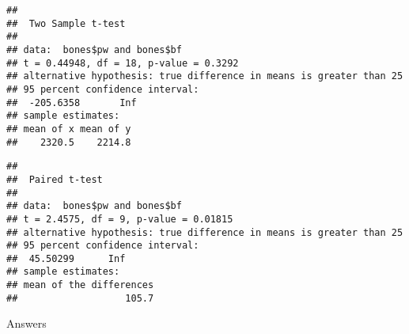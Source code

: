 \documentclass[]{article}
\newenvironment{Shaded}{\begin{snugshade}}{\end{snugshade}}
\newcommand{\KeywordTok}[1]{\textcolor[rgb]{0.13,0.29,0.53}{\textbf{#1}}}
\newcommand{\DataTypeTok}[1]{\textcolor[rgb]{0.13,0.29,0.53}{#1}}
\newcommand{\DecValTok}[1]{\textcolor[rgb]{0.00,0.00,0.81}{#1}}
\newcommand{\StringTok}[1]{\textcolor[rgb]{0.31,0.60,0.02}{#1}}
\newcommand{\CommentTok}[1]{\textcolor[rgb]{0.56,0.35,0.01}{\textit{#1}}}
\newcommand{\OtherTok}[1]{\textcolor[rgb]{0.56,0.35,0.01}{#1}}
\newcommand{\OperatorTok}[1]{\textcolor[rgb]{0.81,0.36,0.00}{\textbf{#1}}}
\newcommand{\NormalTok}[1]{#1}
\begin{document}
\begin{Shaded}
\end{Shaded}

\begin{verbatim}
## 
##  Two Sample t-test
## 
## data:  bones$pw and bones$bf
## t = 0.44948, df = 18, p-value = 0.3292
## alternative hypothesis: true difference in means is greater than 25
## 95 percent confidence interval:
##  -205.6358       Inf
## sample estimates:
## mean of x mean of y 
##    2320.5    2214.8
\end{verbatim}

\begin{Shaded}
\end{Shaded}

\begin{verbatim}
## 
##  Paired t-test
## 
## data:  bones$pw and bones$bf
## t = 2.4575, df = 9, p-value = 0.01815
## alternative hypothesis: true difference in means is greater than 25
## 95 percent confidence interval:
##  45.50299      Inf
## sample estimates:
## mean of the differences 
##                   105.7
\end{verbatim}

\newpage

Answers
\end{document}
